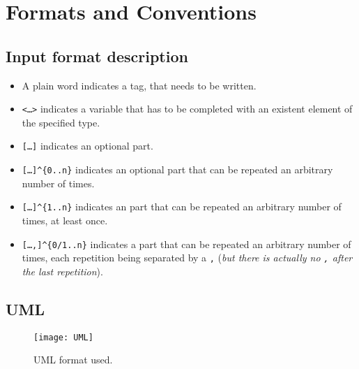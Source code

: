 
\section{Formats and Conventions}

\subsection{Input format description}

\begin{itemize}
  \item A plain word indicates a tag, that needs to be written.
  \item \texttt{<\ldots>} indicates a variable that has to be completed with an existent element of the specified type.
  \item \texttt{[\ldots]} indicates an optional part.
  \item \texttt{[\ldots]\^{}\{0..n\}} indicates an optional part that can be repeated an arbitrary number of times.
  \item \texttt{[\ldots]\^{}\{1..n\}} indicates an part that can be repeated an arbitrary number of times, at least once.
  \item \texttt{[\ldots,]\^{}\{0/1..n\}} indicates a part that can be repeated an arbitrary number of times, each repetition being separated by a \texttt{,} (\emph{but there is actually no \texttt{,} after the last repetition}).
\end{itemize}

\subsection{UML}

\begin{figure}[!h]
  \centering
  \texttt{[image: UML]}
  \caption{UML format used.}
\label{fig:UML}
\end{figure}
